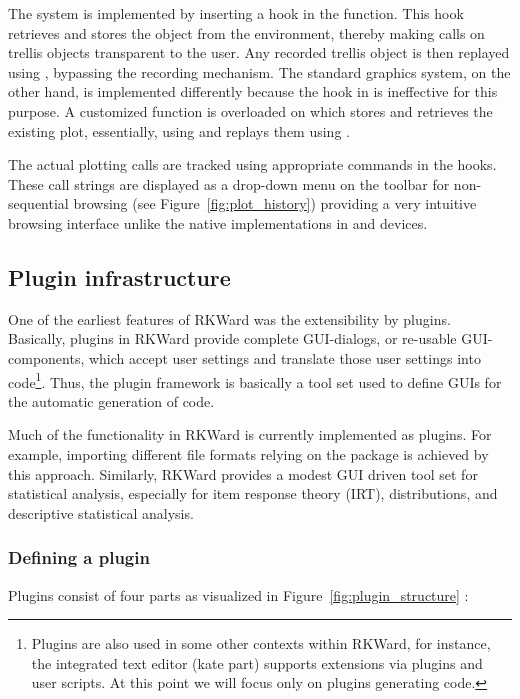 The  system is implemented by inserting a hook in the 
function. This hook retrieves and stores the  object from the
 environment, thereby making  calls on trellis
objects transparent to the user. Any recorded trellis object is then replayed
using , bypassing the recording mechanism. The standard graphics
system, on the other hand, is implemented differently because the hook in
 is ineffective for this purpose. A customized function is overloaded
on  which stores and retrieves the existing plot, essentially, using
 and replays them using .

The actual plotting calls are tracked using appropriate  commands in
the hooks. These call strings are displayed as a drop-down menu on the toolbar
for non-sequential browsing (see Figure~\ref{fig:plot_history}) providing a very intuitive browsing
interface unlike the native implementations in  and  devices.

\subsection{Plugin infrastructure}
\label{sec:technical_plugins}
One of the earliest features of RKWard was the extensibility by plugins.
Basically, plugins in RKWard provide complete GUI-dialogs, or re-usable
GUI-components, which accept user settings and translate those user settings
into  code\footnote{
    Plugins are also used in some other contexts within RKWard, for instance, the
    integrated text editor (kate part) supports extensions via plugins and user scripts. At this point we
    will focus only on plugins generating  code.
}. Thus, the plugin framework is basically a tool set used to define
GUIs for the automatic generation of  code.

Much of the functionality in RKWard is currently implemented as plugins. For example, importing different file
formats relying on the  package is achieved by this approach. Similarly,
RKWard provides a modest GUI driven tool set for statistical analysis,
especially for item response theory (IRT), distributions, and descriptive
statistical analysis.

\subsubsection{Defining a plugin}
\label{sec:technical_plugins_defining}
Plugins consist of four parts as visualized in Figure~\ref{fig:plugin_structure} 
\citep[see Section~\ref{sec:example_plugin} for an example; for a complete
manual, see][]{Friedrichsmeier2010}:

